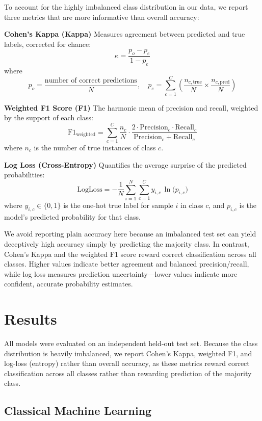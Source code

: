 \documentclass[pdflatex,sn-mathphys]{sn-jnl} %
\begin{document}
To account for the highly imbalanced class distribution in our data, we report three metrics that are more informative than overall accuracy:

\textbf{Cohen’s Kappa (Kappa)}  
    Measures agreement between predicted and true labels, corrected for chance:
    \[
    \kappa = \frac{p_o - p_e}{1 - p_e}
    \]
    where
    \[
    p_o = \frac{\text{number of correct predictions}}{N}, \quad
    p_e = \sum_{c=1}^C \left( \frac{n_{c,\text{true}}}{N} \times \frac{n_{c,\text{pred}}}{N} \right)
    \]

\textbf{Weighted F1 Score (F1)}  
    The harmonic mean of precision and recall, weighted by the support of each class:
    \[
    \mathrm{F1}_{\mathrm{weighted}} = \sum_{c=1}^C \frac{n_c}{N}
        \cdot
        \frac{2 \cdot \text{Precision}_c \cdot \text{Recall}_c}{\text{Precision}_c + \text{Recall}_c}
    \]
    where \(n_c\) is the number of true instances of class \(c\).

\textbf{Log Loss (Cross-Entropy)}  
    Quantifies the average surprise of the predicted probabilities:
    \[
    \mathrm{LogLoss} = -\frac{1}{N}\sum_{i=1}^N \sum_{c=1}^{C}
         y_{i,c}\,\ln\bigl(p_{i,c}\bigr)
    \]
    where \(y_{i,c}\in\{0,1\}\) is the one-hot true label for sample \(i\) in class \(c\), and \(p_{i,c}\) is the model’s predicted probability for that class.


We avoid reporting plain accuracy here because an imbalanced test set can yield deceptively high accuracy simply by predicting the majority class. In contrast, Cohen’s Kappa and the weighted F1 score reward correct classification across all classes. Higher values indicate better agreement and balanced precision/recall, while log loss measures prediction uncertainty—lower values indicate more confident, accurate probability estimates.

\section{Results}

All models were evaluated on an independent held-out test set. Because the class
distribution is heavily imbalanced, we report Cohen's Kappa, weighted F1, and
log-loss (entropy) rather than overall accuracy, as these metrics reward correct
classification across all classes rather than rewarding prediction of the majority
class.

\subsection{Classical Machine Learning}
\end{document}
